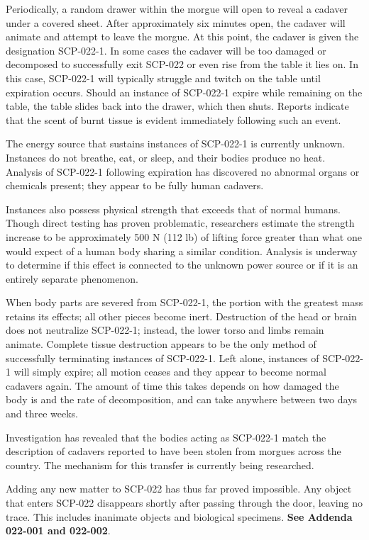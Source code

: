 Periodically, a random drawer within the morgue will open to reveal a cadaver under a covered sheet. After approximately six minutes open, the cadaver will animate and attempt to leave the morgue. At this point, the cadaver is given the designation SCP-022-1. In some cases the cadaver will be too damaged or decomposed to successfully exit SCP-022 or even rise from the table it lies on. In this case, SCP-022-1 will typically struggle and twitch on the table until expiration occurs. Should an instance of SCP-022-1 expire while remaining on the table, the table slides back into the drawer, which then shuts. Reports indicate that the scent of burnt tissue is evident immediately following such an event.

The energy source that sustains instances of SCP-022-1 is currently unknown. Instances do not breathe, eat, or sleep, and their bodies produce no heat. Analysis of SCP-022-1 following expiration has discovered no abnormal organs or chemicals present; they appear to be fully human cadavers.

Instances also possess physical strength that exceeds that of normal humans. Though direct testing has proven problematic, researchers estimate the strength increase to be approximately 500 N (112 lb) of lifting force greater than what one would expect of a human body sharing a similar condition. Analysis is underway to determine if this effect is connected to the unknown power source or if it is an entirely separate phenomenon.

When body parts are severed from SCP-022-1, the portion with the greatest mass retains its effects; all other pieces become inert. Destruction of the head or brain does not neutralize SCP-022-1; instead, the lower torso and limbs remain animate. Complete tissue destruction appears to be the only method of successfully terminating instances of SCP-022-1. Left alone, instances of SCP-022-1 will simply expire; all motion ceases and they appear to become normal cadavers again. The amount of time this takes depends on how damaged the body is and the rate of decomposition, and can take anywhere between two days and three weeks.

Investigation has revealed that the bodies acting as SCP-022-1 match the description of cadavers reported to have been stolen from morgues across the country. The mechanism for this transfer is currently being researched.

Adding any new matter to SCP-022 has thus far proved impossible. Any object that enters SCP-022 disappears shortly after passing through the door, leaving no trace. This includes inanimate objects and biological specimens. \textbf{See Addenda 022-001 and 022-002}.

